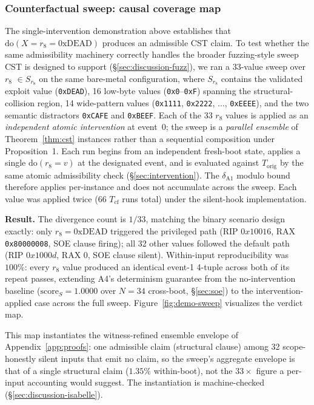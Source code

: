\documentclass[conference]{IEEEtran}
\newcommand{\Korig}{T_\text{orig}}
\newcommand{\Tcf}{T_\text{cf}}
\newcommand{\scoreS}{\text{score}_S}
\newcommand{\dox}[1]{\text{do}(X{=}#1)}
\begin{document}
\subsubsection{Counterfactual sweep: causal coverage map}
\label{sec:eval-demo-sweep}

The single-intervention demonstration above establishes that
$\dox{r_8{=}\text{0xDEAD}}$ produces an admissible CST claim. To
test whether the same admissibility machinery correctly handles
the broader fuzzing-style sweep CST is designed to support
(\S\ref{sec:discussion-fuzz}), we ran a 33-value sweep over $r_8$
$\in S_{r_8}$ on the same bare-metal configuration, where
$S_{r_8}$ contains the validated exploit value
(\texttt{0xDEAD}), 16 low-byte values (\texttt{0x0}--\texttt{0xF})
spanning the structural-collision region, 14 wide-pattern values
(\texttt{0x1111}, \texttt{0x2222}, $\ldots$, \texttt{0xEEEE}),
and the two semantic distractors \texttt{0xCAFE} and
\texttt{0xBEEF}. Each of the 33 $r_8$ values is applied as an
\emph{independent atomic intervention} at event~0; the sweep is a
\emph{parallel ensemble} of Theorem~\ref{thm:cst} instances rather
than a sequential composition under Proposition~1. Each run begins
from an independent fresh-boot state, applies a single
$\text{do}(r_8{=}v)$ at the designated event, and is evaluated
against $\Korig$ by the same atomic admissibility check
(\S\ref{sec:intervention}). The $\delta_{\text{A1}}$ modulo bound
therefore applies per-instance and does not accumulate across the
sweep. Each value was applied twice (66 $\Tcf$ runs total) under
the silent-hook implementation.

\textbf{Result.} The divergence count is $1/33$, matching the
binary scenario design exactly: only $r_8 = \text{0xDEAD}$
triggered the privileged path (RIP $0x10016$, RAX
\texttt{0x80000008}, SOE clause firing); all 32 other values
followed the default path (RIP $0x1000d$, RAX 0, SOE clause
silent). Within-input reproducibility was $100\%$: every $r_8$
value produced an identical event-1 4-tuple across both of its
repeat passes, extending A4's determinism guarantee from the
no-intervention baseline ($\scoreS{=}1.0000$ over $N{=}34$
cross-boot, \S\ref{sec:soe}) to the intervention-applied case
across the full sweep. Figure~\ref{fig:demo-sweep} visualizes the
verdict map.

This map instantiates the witness-refined ensemble envelope of
Appendix~\ref{app:proofs}: one admissible claim (structural clause)
among 32 scope-honestly silent inputs that emit no claim, so the
sweep's aggregate envelope is that of a single structural claim
($1.35\%$ within-boot), not the $33{\times}$ figure a per-input
accounting would suggest. The instantiation is machine-checked
(\S\ref{sec:discussion-isabelle}).
\end{document}

